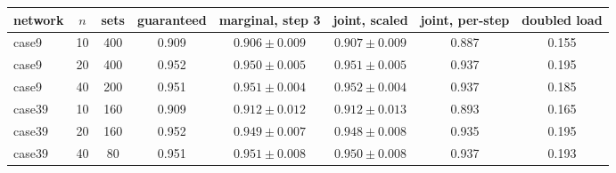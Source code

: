 \begin{tabular}{lccccccc}
\toprule
network & $n$ & sets & guaranteed & marginal, step 3 & joint, scaled & joint, per-step & doubled load\\
\midrule
case9 & 10 & 400 & 0.909 & $0.906\pm0.009$ & $0.907\pm0.009$ & 0.887 & 0.155 \\
case9 & 20 & 400 & 0.952 & $0.950\pm0.005$ & $0.951\pm0.005$ & 0.937 & 0.195 \\
case9 & 40 & 200 & 0.951 & $0.951\pm0.004$ & $0.952\pm0.004$ & 0.937 & 0.185 \\
case39 & 10 & 160 & 0.909 & $0.912\pm0.012$ & $0.912\pm0.013$ & 0.893 & 0.165 \\
case39 & 20 & 160 & 0.952 & $0.949\pm0.007$ & $0.948\pm0.008$ & 0.935 & 0.195 \\
case39 & 40 & 80 & 0.951 & $0.951\pm0.008$ & $0.950\pm0.008$ & 0.937 & 0.193 \\
\bottomrule
\end{tabular}
